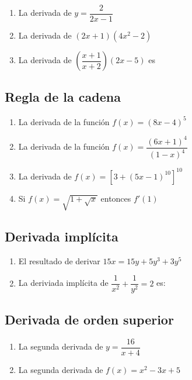 \documentclass[10pt,a4paper]{article}
\begin{document}
\begin{multicols*}{2}
	\begin{enumerate}
		\item La derivada de $y = \dfrac{2}{2x-1}$
		\item La derivada de $(2x+1)(4x^2-2)$
		\item La derivada de $\left(\dfrac{x+1}{x+2}\right)(2x-5)$ es
	\end{enumerate}
	
	
	\subsection{Regla de la cadena}
	\begin{enumerate}
		\item La derivada de la función $f(x) = (8x-4)^5$
		\item La derivada de la función $f(x) = \dfrac{(6x+1)^4}{(1-x)^4}$
		\item La derivada de $f(x) = [3+(5x-1)^10]^10$
		\item Si $f(x) = \sqrt{1+ \sqrt{x}}$ entonces $f'(1)$
	\end{enumerate}
	
	\subsection{Derivada implícita}
	\begin{enumerate}
		\item El resultado de derivar $15x = 15y+5y^3 + 3y^5$
		\item La deriviada implícita de $\dfrac{1}{x^2}+\dfrac{1}{y^2}= 2$ es:
	\end{enumerate}
	
	\subsection{Derivada de orden superior}
	
	\begin{enumerate}
		\item La segunda derivada de $y = \dfrac{16}{x+4}$
		\item La segunda derivada de $f(x) = x^2-3x+5$
	\end{enumerate}
	
	
\end{multicols*}
\end{document}
